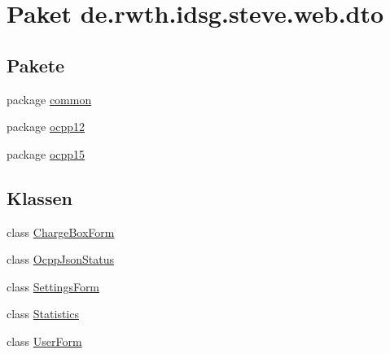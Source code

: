 \hypertarget{namespacede_1_1rwth_1_1idsg_1_1steve_1_1web_1_1dto}{\section{Paket de.\-rwth.\-idsg.\-steve.\-web.\-dto}
\label{namespacede_1_1rwth_1_1idsg_1_1steve_1_1web_1_1dto}
}
\subsection*{Pakete}
\begin{DoxyCompactItemize}
\item 
package \hyperlink{namespacede_1_1rwth_1_1idsg_1_1steve_1_1web_1_1dto_1_1common}{common}
\item 
package \hyperlink{namespacede_1_1rwth_1_1idsg_1_1steve_1_1web_1_1dto_1_1ocpp12}{ocpp12}
\item 
package \hyperlink{namespacede_1_1rwth_1_1idsg_1_1steve_1_1web_1_1dto_1_1ocpp15}{ocpp15}
\end{DoxyCompactItemize}
\subsection*{Klassen}
\begin{DoxyCompactItemize}
\item 
class \hyperlink{classde_1_1rwth_1_1idsg_1_1steve_1_1web_1_1dto_1_1_charge_box_form}{Charge\-Box\-Form}
\item 
class \hyperlink{classde_1_1rwth_1_1idsg_1_1steve_1_1web_1_1dto_1_1_ocpp_json_status}{Ocpp\-Json\-Status}
\item 
class \hyperlink{classde_1_1rwth_1_1idsg_1_1steve_1_1web_1_1dto_1_1_settings_form}{Settings\-Form}
\item 
class \hyperlink{classde_1_1rwth_1_1idsg_1_1steve_1_1web_1_1dto_1_1_statistics}{Statistics}
\item 
class \hyperlink{classde_1_1rwth_1_1idsg_1_1steve_1_1web_1_1dto_1_1_user_form}{User\-Form}
\end{DoxyCompactItemize}

